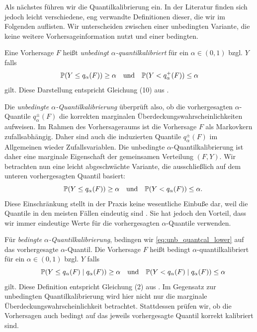 Als nächstes führen wir die Quantilkalibrierung ein. In der Literatur finden sich jedoch leicht verschiedene, eng verwandte Definitionen dieser, die wir im Folgenden auflisten. Wir unterscheiden zwischen einer unbedingten Variante, die keine weitere Vorhersageinformation nutzt und einer bedingten. 

\begin{defi}
Eine Vorhersage $F$ heißt \emph{unbedingt $\alpha$-quantil\-kalibriert} für ein $\alpha  \in (0,1)$  bzgl. $Y$   falls
\begin{equation}\label{eq:uncond_pm_quant_cal}
    \mathbb{P}(Y \leq q_\alpha(F)) \ge \alpha \quad \text{und} \quad  \mathbb{P}(Y < q^+_\alpha(F)) \leq \alpha
\end{equation}
gilt. Diese Darstellung entspricht Gleichung (10) aus \textcite{gneiting2023regression}. 

Die \emph{unbedingte $\alpha$-Quantilkalibrierung} überprüft also, ob die vorhergesagten $\alpha$-Quantile $q^\pm_{\alpha}(F)$ die korrekten marginalen Überdeckungswahrscheinlichkeiten aufweisen. Im Rahmen des Vorhersageraums ist die Vorhersage $F$ als Markovkern zufallsabhängig. Daher sind auch die induzierten Quantile $q^\pm_{\alpha}(F)$ im Allgemeinen wieder Zufallsvariablen. Die unbedingte $\alpha$-Quantilkalibrierung ist daher eine marginale Eigenschaft der gemeinsamen Verteilung $(F,Y)$. Wir betrachten nun eine leicht abgeschwächte Variante, die ausschließlich auf dem unteren vorhergesagten Quantil basiert:
\begin{equation}\label{eq:unb_quantcal_lower}
    \quad \mathbb{P}(Y \leq q_\alpha(F)) \ge \alpha \quad \text{und} \quad  \mathbb{P}(Y < q_\alpha(F)) \leq \alpha.
\end{equation}{}
Diese Einschränkung stellt in der Praxis keine wesentliche Einbuße dar, weil die Quantile in den meisten Fällen eindeutig sind \parencite{arnold2025isotonic}. Sie hat jedoch den Vorteil, dass wir immer eindeutige Werte für die vorhergesagten $\alpha$-Quantile verwenden.

Für \emph{bedingte $\alpha$-Quantilkalibrierung}, bedingen wir \eqref{eq:unb_quantcal_lower} auf das vorhergesagte $\alpha$-Quantil. Die Vorhersage $F$ heißt bedingt $\alpha$-quantilkalibriert für ein $\alpha \in (0,1)$ bzgl. $Y$ falls
\begin{equation}\label{eq:cond_quantcal_lower}
    \quad \mathbb{P}(Y \leq q_\alpha(F) \mid q_\alpha(F)) \ge \alpha \quad \text{und} \quad  \mathbb{P}(Y < q_\alpha(F) \mid q_\alpha(F)) \leq \alpha
\end{equation}{}
gilt.
Diese Definition entspricht Gleichung (2) aus \textcite{gneiting2023model}.
Im Gegensatz zur unbedingten Quantilkalibrierung wird hier nicht nur die marginale Überdeckungs\-wahrscheinlichkeit betrachtet. Stattdessen prüfen wir, ob die Vorhersagen auch bedingt auf das jeweils vorhergesagte Quantil korrekt kalibriert sind.


\end{defi}
